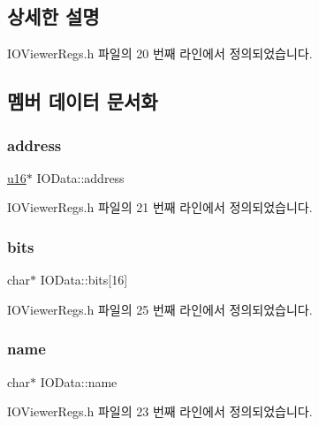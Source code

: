 \subsection{상세한 설명}


I\+O\+Viewer\+Regs.\+h 파일의 20 번째 라인에서 정의되었습니다.



\subsection{멤버 데이터 문서화}
\mbox{\label{struct_i_o_data_a5fcb4807916458a82aef9ed9b51a175e}} 
\subsubsection{\texorpdfstring{address}{address}}
{\footnotesize\ttfamily \mbox{\hyperlink{_system_8h_a9e6c91d77e24643b888dbd1a1a590054}{u16}}$\ast$ I\+O\+Data\+::address}



I\+O\+Viewer\+Regs.\+h 파일의 21 번째 라인에서 정의되었습니다.

\mbox{\label{struct_i_o_data_a31e899a3963226dc851ee4dc9f92a0c1}} 
\subsubsection{\texorpdfstring{bits}{bits}}
{\footnotesize\ttfamily char$\ast$ I\+O\+Data\+::bits\mbox{[}16\mbox{]}}



I\+O\+Viewer\+Regs.\+h 파일의 25 번째 라인에서 정의되었습니다.

\mbox{\label{struct_i_o_data_ae8309728b994911239463cf8eabbfe17}} 
\subsubsection{\texorpdfstring{name}{name}}
{\footnotesize\ttfamily char$\ast$ I\+O\+Data\+::name}



I\+O\+Viewer\+Regs.\+h 파일의 23 번째 라인에서 정의되었습니다.

